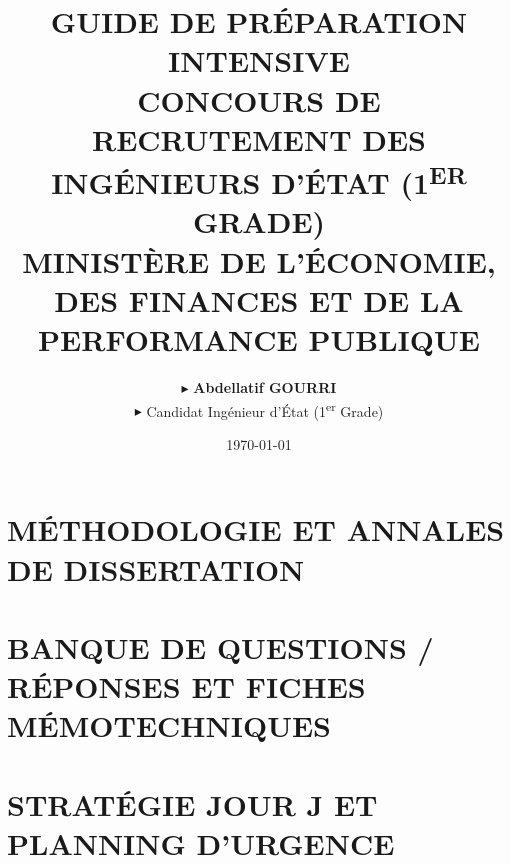 \documentclass[12pt,a4paper]{rapportECL}
\title{GUIDE DE PRÉPARATION INTENSIVE\\CONCOURS DE RECRUTEMENT DES INGÉNIEURS D'ÉTAT (1\textsuperscript{ER} GRADE)\\[0.3cm]\Large MINISTÈRE DE L'ÉCONOMIE, DES FINANCES ET DE LA PERFORMANCE PUBLIQUE}
\author{
    \hspace{0.5cm}$\blacktriangleright$ \textbf{Abdellatif GOURRI}\\[0.1cm]
    \hspace{0.5cm}$\blacktriangleright$ Candidat Ingénieur d'État (1\textsuperscript{er} Grade)\\[0.1cm]
}
\date{\today}
\begin{document}
\hypersetup{pageanchor=false}
\maketitle
\thispagestyle{empty}
\hypersetup{pageanchor=true}

\newpage
\thispagestyle{empty}
\mbox{}
\newpage

\setcounter{page}{1}



\tableofcontents
\newpage


\newpage

\setcounter{page}{1}



\part{MÉTHODOLOGIE ET ANNALES DE DISSERTATION}




\part{BANQUE DE QUESTIONS / RÉPONSES ET FICHES MÉMOTECHNIQUES}




\part{STRATÉGIE JOUR J ET PLANNING D'URGENCE}



\end{document}
